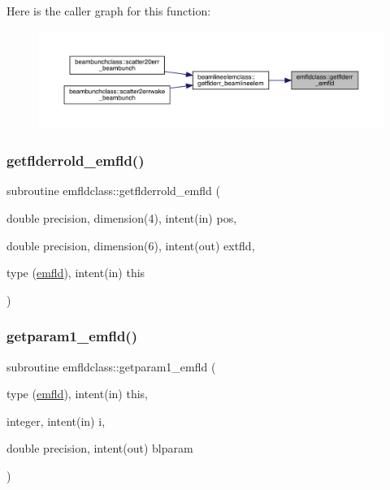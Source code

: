 Here is the caller graph for this function\+:\nopagebreak
\begin{figure}[H]
\begin{center}
\leavevmode
\includegraphics[width=350pt]{namespaceemfldclass_ad7628b9fdaf5e839e55f71c3f8678c11_icgraph}
\end{center}
\end{figure}
\mbox{\label{namespaceemfldclass_a828e010a02ef4b8d9806f8d4c3053126}} 
\subsubsection{\texorpdfstring{getflderrold\_emfld()}{getflderrold\_emfld()}}
{\footnotesize\ttfamily subroutine emfldclass\+::getflderrold\+\_\+emfld (\begin{DoxyParamCaption}\item[{double precision, dimension(4), intent(in)}]{pos,  }\item[{double precision, dimension(6), intent(out)}]{extfld,  }\item[{type (\mbox{\hyperlink{namespaceemfldclass_structemfldclass_1_1emfld}{emfld}}), intent(in)}]{this }\end{DoxyParamCaption})}

\mbox{\label{namespaceemfldclass_ae0e0b406ff0837e878753ad73fc1862d}} 
\subsubsection{\texorpdfstring{getparam1\_emfld()}{getparam1\_emfld()}}
{\footnotesize\ttfamily subroutine emfldclass\+::getparam1\+\_\+emfld (\begin{DoxyParamCaption}\item[{type (\mbox{\hyperlink{namespaceemfldclass_structemfldclass_1_1emfld}{emfld}}), intent(in)}]{this,  }\item[{integer, intent(in)}]{i,  }\item[{double precision, intent(out)}]{blparam }\end{DoxyParamCaption})}

